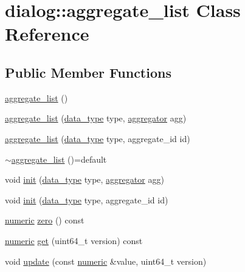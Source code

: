 \hypertarget{classdialog_1_1aggregate__list}{}\section{dialog\+:\+:aggregate\+\_\+list Class Reference}
\label{classdialog_1_1aggregate__list}
\subsection*{Public Member Functions}
\begin{DoxyCompactItemize}
\item 
\hyperlink{classdialog_1_1aggregate__list_ae417d77b203ef1f997ff539727d545d3}{aggregate\+\_\+list} ()
\item 
\hyperlink{classdialog_1_1aggregate__list_a69fa69ed6498a0f58131e1b3c123a08c}{aggregate\+\_\+list} (\hyperlink{structdialog_1_1data__type}{data\+\_\+type} type, \hyperlink{structdialog_1_1aggregator}{aggregator} agg)
\item 
\hyperlink{classdialog_1_1aggregate__list_a7077691cf569731f907c3834be6a769e}{aggregate\+\_\+list} (\hyperlink{structdialog_1_1data__type}{data\+\_\+type} type, aggregate\+\_\+id id)
\item 
\hyperlink{classdialog_1_1aggregate__list_ad767031cda7f81971814ff328371f22d}{$\sim$aggregate\+\_\+list} ()=default
\item 
void \hyperlink{classdialog_1_1aggregate__list_ae55dc54fd08454fb30679fe54650cd76}{init} (\hyperlink{structdialog_1_1data__type}{data\+\_\+type} type, \hyperlink{structdialog_1_1aggregator}{aggregator} agg)
\item 
void \hyperlink{classdialog_1_1aggregate__list_aa362f04871cc8759088cef403c2fb063}{init} (\hyperlink{structdialog_1_1data__type}{data\+\_\+type} type, aggregate\+\_\+id id)
\item 
\hyperlink{classdialog_1_1numeric}{numeric} \hyperlink{classdialog_1_1aggregate__list_a71092c5dd73dff8aaf4ebf655e0e397e}{zero} () const
\item 
\hyperlink{classdialog_1_1numeric}{numeric} \hyperlink{classdialog_1_1aggregate__list_aaa2ee2ba5a82eb6f6a31b33b0dcb93da}{get} (uint64\+\_\+t version) const
\item 
void \hyperlink{classdialog_1_1aggregate__list_a7547b4bbbcc0a41dd020f1c58de69f82}{update} (const \hyperlink{classdialog_1_1numeric}{numeric} \&value, uint64\+\_\+t version)
\end{DoxyCompactItemize}


